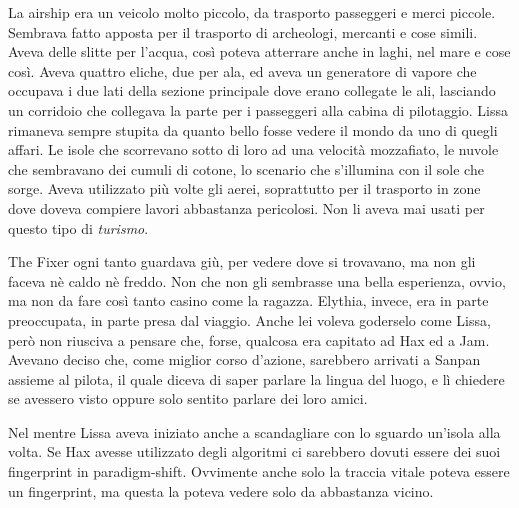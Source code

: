     La airship era un veicolo molto piccolo, da trasporto passeggeri e
    merci piccole. Sembrava fatto apposta per il trasporto di archeologi,
    mercanti e cose simili. Aveva delle slitte per l'acqua, così poteva
    atterrare anche in laghi, nel mare e cose così. Aveva quattro eliche,
    due per ala, ed aveva un generatore di vapore che occupava i due lati
    della sezione principale dove erano collegate le ali, lasciando un
    corridoio che collegava la parte per i passeggeri alla cabina di
    pilotaggio. Lissa rimaneva sempre stupita da quanto bello fosse vedere
    il mondo da uno di quegli affari. Le isole che scorrevano sotto di loro
    ad una velocità mozzafiato, le nuvole che sembravano dei cumuli di
    cotone, lo scenario che s'illumina con il sole che sorge. Aveva
    utilizzato più volte gli aerei, soprattutto per il trasporto in zone
    dove doveva compiere lavori abbastanza pericolosi. Non li aveva mai
    usati per questo tipo di \emph{turismo}.

    The Fixer ogni tanto guardava giù, per vedere dove si trovavano, ma non
    gli faceva nè caldo nè freddo. Non che non gli sembrasse una bella
    esperienza, ovvio, ma non da fare così tanto casino come la ragazza.
    Elythia, invece, era in parte preoccupata, in parte presa dal viaggio.
    Anche lei voleva goderselo come Lissa, però non riusciva a pensare che,
    forse, qualcosa era capitato ad Hax ed a Jam. Avevano deciso che, come
    miglior corso d'azione, sarebbero arrivati a Sanpan assieme al pilota,
    il quale diceva di saper parlare la lingua del luogo, e lì chiedere se
    avessero visto oppure solo sentito parlare dei loro amici.

    Nel mentre Lissa aveva iniziato anche a scandagliare con lo sguardo
    un'isola alla volta. Se Hax avesse utilizzato degli algoritmi ci
    sarebbero dovuti essere dei suoi fingerprint in paradigm-shift.
    Ovvimente anche solo la traccia vitale poteva essere un fingerprint, ma
    questa la poteva vedere solo da abbastanza vicino.
    
